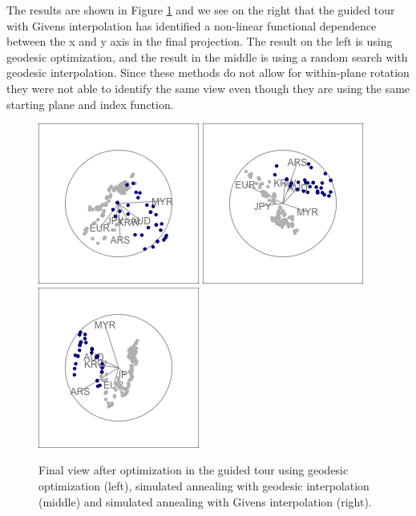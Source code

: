 The results are shown in Figure \ref{fig:rates-tour-static} and we see
on the right that the guided tour with Givens interpolation has
identified a non-linear functional dependence between the x and y axis
in the final projection. The result on the left is using geodesic
optimization, and the result in the middle is using a random search with
geodesic interpolation. Since these methods do not allow for
within-plane rotation they were not able to identify the same view even
though they are using the same starting plane and index function.

\begin{Schunk}
\begin{figure}

{\centering \includegraphics[width=0.3\linewidth]{figures/rates_tour_geodesic_final} \includegraphics[width=0.3\linewidth]{figures/rates_tour_better_final} \includegraphics[width=0.3\linewidth]{figures/rates_tour_givens_final} 

}

\caption[Final view after optimization in the guided tour using geodesic optimization (left), simulated annealing with geodesic interpolation (middle) and simulated annealing with Givens interpolation (right)]{Final view after optimization in the guided tour using geodesic optimization (left), simulated annealing with geodesic interpolation (middle) and simulated annealing with Givens interpolation (right).}\label{fig:rates-tour-static}
\end{figure}
\end{Schunk}

